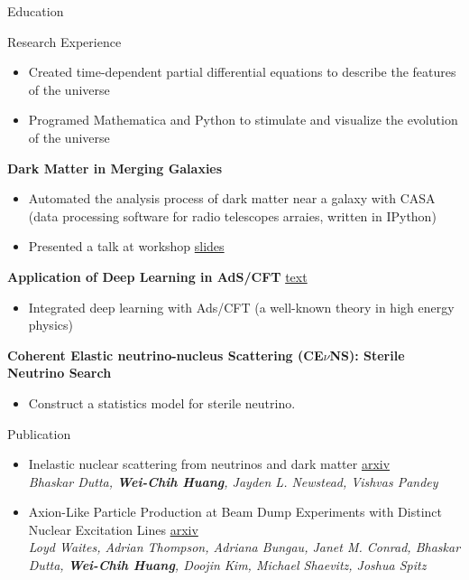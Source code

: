 \documentclass{resume}
\begin{document}
\begin{rSection}{Education}
\begin{rSection}{Research Experience}
    \begin{itemize}
    \itemsep -3pt {}
    \item Created time-dependent partial differential equations to describe the features of the universe
    \item Programed Mathematica and Python to stimulate and visualize the evolution of the universe
    \end{itemize}
\item \textbf{Dark Matter in Merging Galaxies}
    \begin{itemize}
    \itemsep -3pt {}
    \item Automated the analysis process of dark matter near a galaxy with CASA (data processing software for radio telescopes arraies, written in IPython)
    \item Presented a talk at workshop \href{https://noctildon.github.io/physics/dm.pdf}{slides}
    \end{itemize}
\item \textbf{Application of Deep Learning in AdS/CFT} \hfill \href{https://noctildon.github.io/physics/DL.pdf}{text}
    \begin{itemize}
    \itemsep -3pt {}
    \item Integrated deep learning with Ads/CFT (a well-known theory in high energy physics)
    \end{itemize}
\item \textbf{Coherent Elastic neutrino-nucleus Scattering (CE$\nu$NS): Sterile Neutrino Search}
    \begin{itemize}
    \itemsep -3pt {}
    \item Construct a statistics model for sterile neutrino.
    \end{itemize}
\end{rSection}


\begin{rSection}{Publication}
    \begin{itemize}
        \item Inelastic nuclear scattering from neutrinos and dark matter \hfill \href{https://arxiv.org/pdf/2206.08590.pdf}{arxiv}\\
        {\footnotesize \it Bhaskar Dutta, \textbf{Wei-Chih Huang}, Jayden L. Newstead, Vishvas Pandey}
        \item Axion-Like Particle Production at Beam Dump Experiments with Distinct Nuclear Excitation Lines \hfill \href{https://arxiv.org/pdf/2207.13659.pdf}{arxiv}\\
        {\footnotesize \it Loyd Waites, Adrian Thompson, Adriana Bungau, Janet M. Conrad, Bhaskar Dutta, \textbf{Wei-Chih Huang}, Doojin Kim, Michael Shaevitz, Joshua Spitz}
    \end{itemize}
\end{rSection}



\end{rSection}
\end{document}
